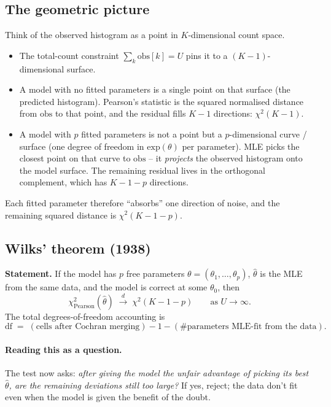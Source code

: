 \documentclass[11pt]{article}
\newcommand{\obs}{\mathrm{obs}}
\newcommand{\expc}{\mathrm{exp}}
\begin{document}
\subsection{The geometric picture}

Think of the observed histogram as a point in $K$-dimensional count space.
\begin{itemize}[leftmargin=2em,itemsep=2pt]
\item The total-count constraint $\sum_k \obs[k] = U$ pins it to a
       $(K-1)$-dimensional surface.
\item A model with no fitted parameters is a single point on that surface
       (the predicted histogram). Pearson's statistic is the squared
       normalised distance from $\obs$ to that point, and the residual fills
       $K-1$ directions: $\chi^{2}(K-1)$.
\item A model with $p$ fitted parameters is not a point but a
       $p$-dimensional curve / surface (one degree of freedom in
       $\expc(\theta)$ per parameter). MLE picks the closest point on that
       curve to $\obs$ -- it \emph{projects} the observed histogram onto the
       model surface. The remaining residual lives in the orthogonal
       complement, which has $K - 1 - p$ directions.
\end{itemize}
Each fitted parameter therefore ``absorbs'' one direction of noise, and the
remaining squared distance is $\chi^{2}(K - 1 - p)$.

\subsection{Wilks' theorem (1938)}

\textbf{Statement.} If the model has $p$ free parameters
$\theta = (\theta_1, \dots, \theta_p)$, $\hat\theta$ is the MLE from the same
data, and the model is correct at some $\theta_0$, then
\[
   \chi^{2}_{\text{Pearson}}(\hat\theta)
   \;\overset{d}{\longrightarrow}\; \chi^{2}(K - 1 - p)
   \qquad \text{as } U \to \infty.
\]
The total degrees-of-freedom accounting is
\[
   \mathrm{df} \;=\; (\text{cells after Cochran merging}) - 1
                 - (\text{\# parameters MLE-fit from the data}).
\]

\paragraph{Reading this as a question.}
The test now asks: \emph{after giving the model the unfair advantage of
picking its best $\hat\theta$, are the remaining deviations still too
large?} If yes, reject; the data don't fit even when the model is given the
benefit of the doubt.
\end{document}
